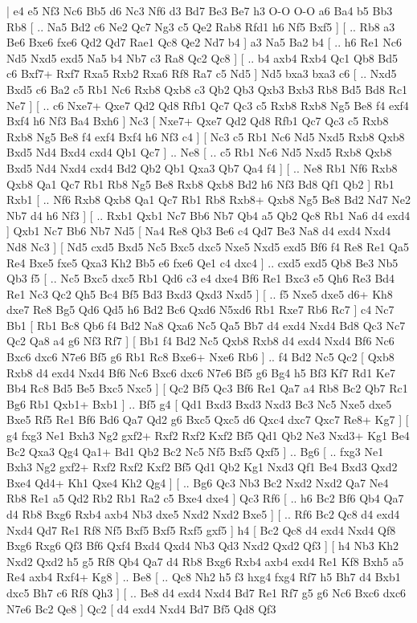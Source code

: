 \makegametitle 
|   e4   e5    Nf3   Nc6    Bb5   d6    Nc3   Nf6    d3   Bd7   Be3   Be7    h3   O-O    O-O   a6    Ba4   b5    Bb3   Rb8 [ .. Na5  Bd2 c6  Ne2 Qc7  Ng3 c5  Qe2 Rab8  Rfd1 h6  Nf5 Bxf5   ]  [ .. Rb8  a3 Be6  Bxe6 fxe6  Qd2 Qd7  Rae1 Qc8  Qe2 Nd7  b4   ]  a3   Na5    Ba2   b4 [ .. h6  Re1 Nc6  Nd5 Nxd5  exd5 Na5  b4 Nb7  c3 Ra8  Qc2 Qc8   ]  [ .. b4  axb4 Rxb4  Qc1 Qb8  Bd5 c6  Bxf7+ Rxf7  Rxa5 Rxb2  Rxa6 Rf8  Ra7 c5  Nd5   ]  Nd5   bxa3    bxa3   c6 [ .. Nxd5  Bxd5 c6  Ba2 c5  Rb1 Nc6  Rxb8 Qxb8  c3 Qb2  Qb3 Qxb3  Bxb3 Rb8  Bd5 Bd8  Rc1 Ne7   ]  [ .. c6  Nxe7+ Qxe7  Qd2 Qd8  Rfb1 Qc7  Qc3 c5  Rxb8 Rxb8  Ng5 Be8  f4 exf4  Bxf4 h6  Nf3 Ba4  Bxh6   ]  Nc3 [  Nxe7+ Qxe7  Qd2 Qd8  Rfb1 Qc7  Qc3 c5  Rxb8 Rxb8  Ng5 Be8  f4 exf4  Bxf4 h6  Nf3 c4   ]  [  Nc3 c5  Rb1 Nc6  Nd5 Nxd5  Rxb8 Qxb8  Bxd5 Nd4  Bxd4 cxd4  Qb1 Qc7   ] .. Ne8 [ .. c5  Rb1 Nc6  Nd5 Nxd5  Rxb8 Qxb8  Bxd5 Nd4  Nxd4 cxd4  Bd2 Qb2  Qb1 Qxa3  Qb7 Qa4  f4   ]  [ .. Ne8  Rb1 Nf6  Rxb8 Qxb8  Qa1 Qc7  Rb1 Rb8  Ng5 Be8  Rxb8 Qxb8  Bd2 h6  Nf3 Bd8  Qf1 Qb2   ]  Rb1   Rxb1    [ .. Nf6  Rxb8 Qxb8  Qa1 Qc7  Rb1 Rb8  Rxb8+ Qxb8  Ng5 Be8  Bd2 Nd7  Ne2 Nb7  d4 h6  Nf3   ]  [ .. Rxb1  Qxb1 Nc7  Bb6 Nb7  Qb4 a5  Qb2 Qc8  Rb1 Na6  d4 exd4   ]  Qxb1   Nc7    Bb6   Nb7    Nd5 [  Na4 Re8  Qb3 Be6  c4 Qd7  Be3 Na8  d4 exd4  Nxd4 Nd8  Nc3   ]  [  Nd5 cxd5  Bxd5 Nc5  Bxc5 dxc5  Nxe5 Nxd5  exd5 Bf6  f4 Re8  Re1 Qa5  Re4 Bxe5  fxe5 Qxa3  Kh2 Bb5  e6 fxe6  Qe1 c4  dxc4   ] .. cxd5    exd5   Qb8    Be3   Nb5    Qb3   f5 [ .. Nc5  Bxc5 dxc5  Rb1 Qd6  c3 e4  dxe4 Bf6  Re1 Bxc3  e5 Qh6  Re3 Bd4  Re1 Nc3  Qc2 Qh5  Bc4 Bf5  Bd3 Bxd3  Qxd3 Nxd5   ]  [ .. f5  Nxe5 dxe5  d6+ Kh8  dxe7 Re8  Bg5 Qd6  Qd5 h6  Bd2 Bc6  Qxd6 N5xd6  Rb1 Rxe7  Rb6 Rc7   ]  c4   Nc7    Bb1 [  Rb1 Bc8  Qb6 f4  Bd2 Na8  Qxa6 Nc5  Qa5 Bb7  d4 exd4  Nxd4 Bd8  Qc3 Nc7  Qc2 Qa8  a4 g6  Nf3 Rf7   ]  [  Bb1 f4  Bd2 Nc5  Qxb8 Rxb8  d4 exd4  Nxd4 Bf6  Nc6 Bxc6  dxc6 N7e6  Bf5 g6  Rb1 Rc8  Bxe6+ Nxe6  Rb6   ] .. f4    Bd2   Nc5    Qc2 [  Qxb8 Rxb8  d4 exd4  Nxd4 Bf6  Nc6 Bxc6  dxc6 N7e6  Bf5 g6  Bg4 h5  Bf3 Kf7  Rd1 Ke7  Bb4 Rc8  Bd5 Be5  Bxc5 Nxc5   ]  [  Qc2 Bf5  Qc3 Bf6  Re1 Qa7  a4 Rb8  Bc2 Qb7  Rc1 Bg6  Rb1 Qxb1+  Bxb1   ] .. Bf5    g4 [  Qd1 Bxd3  Bxd3 Nxd3  Bc3 Nc5  Nxe5 dxe5  Bxe5 Rf5  Re1 Bf6  Bd6 Qa7  Qd2 g6  Bxc5 Qxc5  d6 Qxc4  dxc7 Qxc7  Re8+ Kg7   ]  [  g4 fxg3  Ne1 Bxh3  Ng2 gxf2+  Rxf2 Rxf2  Kxf2 Bf5  Qd1 Qb2  Ne3 Nxd3+  Kg1 Be4  Bc2 Qxa3  Qg4 Qa1+  Bd1 Qb2  Bc2 Nc5  Nf5 Bxf5  Qxf5   ] .. Bg6 [ .. fxg3  Ne1 Bxh3  Ng2 gxf2+  Rxf2 Rxf2  Kxf2 Bf5  Qd1 Qb2  Kg1 Nxd3  Qf1 Be4  Bxd3 Qxd2  Bxe4 Qd4+  Kh1 Qxe4  Kh2 Qg4   ]  [ .. Bg6  Qc3 Nb3  Bc2 Nxd2  Nxd2 Qa7  Ne4 Rb8  Re1 a5  Qd2 Rb2  Rb1 Ra2  c5 Bxe4  dxe4   ]  Qc3   Rf6 [ .. h6  Bc2 Bf6  Qb4 Qa7  d4 Rb8  Bxg6 Rxb4  axb4 Nb3  dxe5 Nxd2  Nxd2 Bxe5   ]  [ .. Rf6  Bc2 Qc8  d4 exd4  Nxd4 Qd7  Re1 Rf8  Nf5 Bxf5  Bxf5 Rxf5  gxf5   ]  h4 [  Bc2 Qc8  d4 exd4  Nxd4 Qf8  Bxg6 Rxg6  Qf3 Bf6  Qxf4 Bxd4  Qxd4 Nb3  Qd3 Nxd2  Qxd2 Qf3   ]  [  h4 Nb3  Kh2 Nxd2  Qxd2 h5  g5 Rf8  Qb4 Qa7  d4 Rb8  Bxg6 Rxb4  axb4 exd4  Re1 Kf8  Bxh5 a5  Re4 axb4  Rxf4+ Kg8   ] .. Be8 [ .. Qc8  Nh2 h5  f3 hxg4  fxg4 Rf7  h5 Bh7  d4 Bxb1  dxc5 Bh7  c6 Rf8  Qh3   ]  [ .. Be8  d4 exd4  Nxd4 Bd7  Re1 Rf7  g5 g6  Nc6 Bxc6  dxc6 N7e6  Bc2 Qe8   ]  Qc2 [  d4 exd4  Nxd4 Bd7  Bf5 Qd8  Qf3 